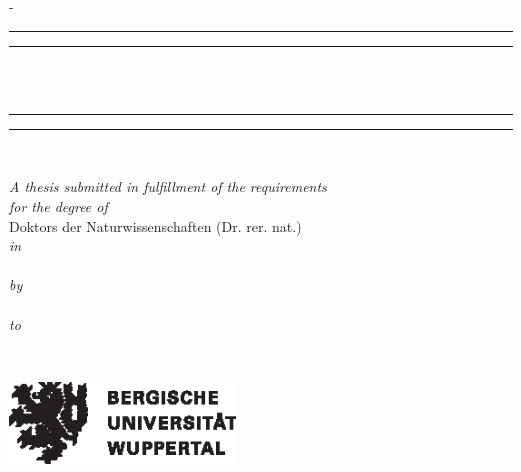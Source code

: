 

\begin{titlingpage}
\begin{SingleSpace}

\calccentering{\unitlength} 
\begin{adjustwidth*}{\unitlength}{-\unitlength}
\begin{center}

\vspace{12mm}

\rule[0.5ex]{\linewidth}{2pt}\vspace*{-\baselineskip}\vspace*{3.2pt}
\rule[0.5ex]{\linewidth}{1pt}\\%
\noindent
{\HUGE{\utstitle}} \\[1.5mm] %
\rule[0.5ex]{\linewidth}{1pt}\vspace*{-\baselineskip}\vspace{4pt}
\rule[0.5ex]{\linewidth}{2pt}\\
\vspace {10mm}


\emph{\large A thesis submitted in fulfillment of the requirements}\\
\vspace {2mm}
\emph{\large for the degree of}\\
\vspace {5mm}
{\large Doktors der Naturwissenschaften (Dr. rer. nat.)}\\
\vspace{2mm}
\emph{in}\\
\vspace{2mm}
{\large \utsfield}\\
\vspace {5mm}
\emph{\large by}\\
\vspace{2mm}
{\bfseries \Large \utsname} \\ %
\vspace {5mm}
\emph{\large to}\\
\vspace{4mm}
{\large \utsfaculty \\
\vspace {2mm}

\begin{center}
    \includegraphics[width=6cm]{assets/BUW_Logo-schwarz.eps}
\end{center}

}
\end{center}
\end{adjustwidth*}
\end{SingleSpace}
\end{titlingpage}
